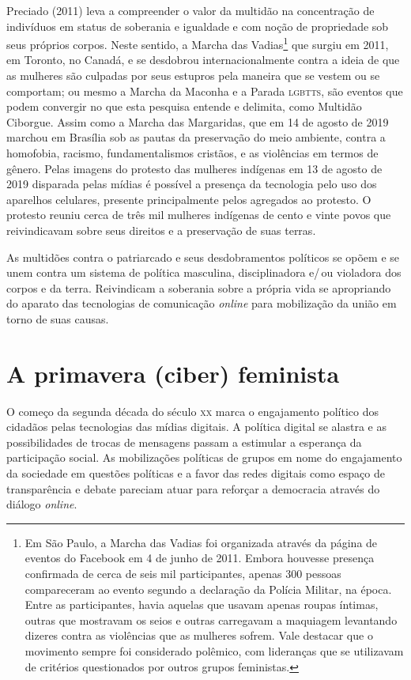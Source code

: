 Preciado (2011) leva a compreender o valor da multidão na concentração
de indivíduos em status de soberania e igualdade e com noção de
propriedade sob seus próprios corpos. Neste sentido, a Marcha das
Vadias\footnote{Em São Paulo, a Marcha das Vadias foi organizada através
  da página de eventos do Facebook em 4 de junho de 2011. Embora
  houvesse presença confirmada de cerca de seis mil participantes,
  apenas 300 pessoas compareceram ao evento segundo a declaração da
  Polícia Militar, na época. Entre as participantes, havia aquelas que
  usavam apenas roupas íntimas, outras que mostravam os seios e outras
  carregavam a maquiagem levantando dizeres contra as violências que as
  mulheres sofrem. Vale destacar que o movimento sempre foi considerado
  polêmico, com lideranças que se utilizavam de critérios questionados
  por outros grupos feministas.} que surgiu em 2011, em Toronto, no
Canadá, e se desdobrou internacionalmente contra a ideia de que as
mulheres são culpadas por seus estupros pela maneira que se vestem ou se
comportam; ou mesmo a Marcha da Maconha e a Parada \textsc{lgbtts}, são eventos
que podem convergir no que esta pesquisa entende e delimita, como
Multidão Ciborgue. Assim como a Marcha das Margaridas, que em 14 de
agosto de 2019 marchou em Brasília sob as pautas da preservação do meio
ambiente, contra a homofobia, racismo, fundamentalismos cristãos, e as
violências em termos de gênero. Pelas imagens do protesto das mulheres
indígenas em 13 de agosto de 2019 disparada pelas mídias é possível a
presença da tecnologia pelo uso dos aparelhos celulares, presente
principalmente pelos agregados ao protesto. O protesto reuniu cerca de
três mil mulheres indígenas de cento e vinte povos que reivindicavam
sobre seus direitos e a preservação de suas terras.

As multidões contra o patriarcado e seus desdobramentos políticos se
opõem e se unem contra um sistema de política masculina, disciplinadora
e/\,ou violadora dos corpos e da terra. Reivindicam a soberania sobre a
própria vida se apropriando do aparato das tecnologias de comunicação
\textit{online} para mobilização da união em torno de suas causas.

\section{A primavera (ciber) feminista}

O começo da segunda década do século \textsc{xx} marca o engajamento político dos
cidadãos pelas tecnologias das mídias digitais. A política digital se
alastra e as possibilidades de trocas de mensagens passam a estimular a
esperança da participação social. As mobilizações políticas de grupos em
nome do engajamento da sociedade em questões políticas e a favor das
redes digitais como espaço de transparência e debate pareciam atuar para
reforçar a democracia através do diálogo \textit{online}.


